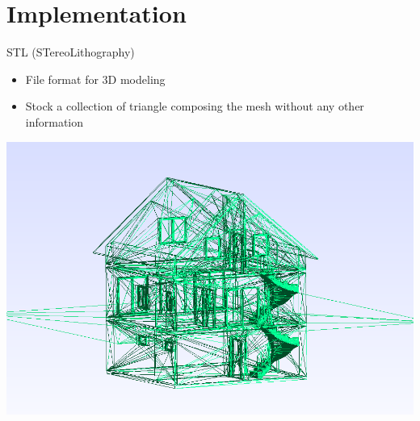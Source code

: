 \documentclass[10pt]{beamer}
\begin{document}
\section{Implementation}
\begin{frame}{STL (STereoLithography)}
    \begin{itemize}
        \item File format for 3D modeling
        \item Stock a collection of triangle composing the mesh without any other information
    \end{itemize}
    \begin{center}
        \includegraphics[scale=0.3]{../../images/ACJASMINSTL.png}
    \end{center}
\end{frame}
\end{document}

